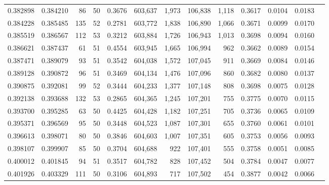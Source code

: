 \begin{tabular}{rrrrrrrrrrrrr}
0.382898 & 0.384210 &    86 &  50 &                                     0.3676 & 603,637 &   1,973 & 106,838 &   1,118 & 0.3617 & 0.0104 & 0.0183 \\
0.384228 & 0.385485 &   135 &  52 &                                     0.2781 & 603,772 &   1,838 & 106,890 &   1,066 & 0.3671 & 0.0099 & 0.0170 \\
0.385519 & 0.386567 &   112 &  53 &                                     0.3212 & 603,884 &   1,726 & 106,943 &   1,013 & 0.3698 & 0.0094 & 0.0160 \\
0.386621 & 0.387437 &    61 &  51 &                                     0.4554 & 603,945 &   1,665 & 106,994 &     962 & 0.3662 & 0.0089 & 0.0154 \\
0.387471 & 0.389079 &    93 &  51 &                                     0.3542 & 604,038 &   1,572 & 107,045 &     911 & 0.3669 & 0.0084 & 0.0146 \\
0.389128 & 0.390872 &    96 &  51 &                                     0.3469 & 604,134 &   1,476 & 107,096 &     860 & 0.3682 & 0.0080 & 0.0137 \\
0.390875 & 0.392081 &    99 &  52 &                                     0.3444 & 604,233 &   1,377 & 107,148 &     808 & 0.3698 & 0.0075 & 0.0128 \\
0.392138 & 0.393688 &   132 &  53 &                                     0.2865 & 604,365 &   1,245 & 107,201 &     755 & 0.3775 & 0.0070 & 0.0115 \\
0.393700 & 0.395285 &    63 &  50 &                                     0.4425 & 604,428 &   1,182 & 107,251 &     705 & 0.3736 & 0.0065 & 0.0109 \\
0.395371 & 0.396569 &    95 &  50 &                                     0.3448 & 604,523 &   1,087 & 107,301 &     655 & 0.3760 & 0.0061 & 0.0101 \\
0.396613 & 0.398071 &    80 &  50 &                                     0.3846 & 604,603 &   1,007 & 107,351 &     605 & 0.3753 & 0.0056 & 0.0093 \\
0.398107 & 0.399907 &    85 &  50 &                                     0.3704 & 604,688 &     922 & 107,401 &     555 & 0.3758 & 0.0051 & 0.0085 \\
0.400012 & 0.401845 &    94 &  51 &                                     0.3517 & 604,782 &     828 & 107,452 &     504 & 0.3784 & 0.0047 & 0.0077 \\
0.401926 & 0.403329 &   111 &  50 &                                     0.3106 & 604,893 &     717 & 107,502 &     454 & 0.3877 & 0.0042 & 0.0066 \\

\end{tabular}
